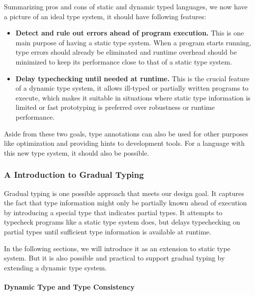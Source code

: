 Summarizing pros and cons of static and dynamic typed languages,
we now have a picture of an ideal type system, it should have following features:

\begin{itemize}
	\item \textbf{Detect and rule out errors ahead of program execution.}
	This is one main purpose of having a static type system. When a program starts running,
	type errors should already be eliminated and runtime overhead should be minimized
	to keep its performance close to that of a static type system.
	\item \textbf{Delay typechecking until needed at runtime.}
	This is the crucial feature of a dynamic type system,
	it allows ill-typed or partially written programs to execute,
	which makes it suitable in situations where static type information
	is limited or fast prototyping is preferred over robustness or runtime performance.
\end{itemize}

Aside from these two goals, type annotations can also be used for
other purposes like optimization and providing hints to development tools.
For a language with this new type system, it should also be possible.

\subsubsection{A Introduction to Gradual Typing}

\newcommand{\dyn}{\textbf{dyn}}

Gradual typing is one possible approach that meets our design goal.
It captures the fact that type information might only be partially known
ahead of execution by introducing a special type that indicates partial types.
It attempts to typecheck programs like a static type system does, but delays
typechecking on partial types until sufficient type information is available
at runtime.

In the following sections, we will introduce it
as an extension to static type system.
But it is also possible and practical to support gradual typing by
extending a dynamic type system.


\paragraph{Dynamic Type and Type Consistency}


